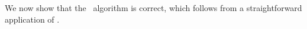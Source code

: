%

We now show that the \PR\ algorithm is correct, which follows from a
straightforward application of .

